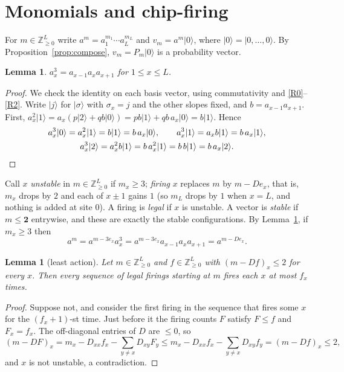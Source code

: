 \documentclass[11pt]{amsart}
\newtheorem{lemma}[theorem]{Lemma}
\theoremstyle{definition}
\theoremstyle{remark}
\newcommand{\Z}{\mathbb{Z}}
\newcommand{\ket}[1]{|#1\rangle}
\newcommand{\two}{\mathbf{2}}
\begin{document}
\section{Monomials and chip-firing}\label{sec:chip}

For $m\in\Z_{\ge0}^L$ write $a^m=a_1^{m_1}\cdots a_L^{m_L}$ and $v_m=a^m\ket{0}$, where $\ket{0}=\ket{0,\dots,0}$. By Proposition~\ref{prop:compose}, $v_m=P_m\ket0$ is a probability vector.

\begin{lemma}\label{lem:cube}
$a_x^3=a_{x-1}a_xa_{x+1}$ for $1\le x\le L$.
\end{lemma}

\begin{proof}
We check the identity on each basis vector, using commutativity and \eqref{R0}--\eqref{R2}. Write $\ket{j}$ for $\ket{\sigma}$ with $\sigma_x=j$ and the other slopes fixed, and $b=a_{x-1}a_{x+1}$. First, $a_x^2\ket1=a_x(p\ket2+qb\ket0)=pb\ket1+qb\,a_x\ket0=b\ket1$. Hence
\begin{gather*}
a_x^3\ket0=a_x^2\ket1=b\ket1=b\,a_x\ket0,\qquad
a_x^3\ket1=a_xb\ket1=b\,a_x\ket1,\\
a_x^3\ket2=a_x^2b\ket1=b\,a_x^2\ket1=b\,b\ket1=b\,a_x\ket2 .\qedhere
\end{gather*}
\end{proof}

Call $x$ \emph{unstable} in $m\in\Z_{\ge0}^L$ if $m_x\ge3$; \emph{firing} $x$ replaces $m$ by $m-De_x$, that is, $m_x$ drops by $2$ and each of $x\pm1$ gains $1$ (so $m_L$ drops by $1$ when $x=L$, and nothing is added at site $0$). A firing is \emph{legal} if $x$ is unstable. A vector is \emph{stable} if $m\le\two$ entrywise, and these are exactly the stable configurations. By Lemma~\ref{lem:cube}, if $m_x\ge3$ then
\begin{equation}\label{eq:firing}
a^m=a^{m-3e_x}a_x^3=a^{m-3e_x}a_{x-1}a_xa_{x+1}=a^{m-De_x}.
\end{equation}

\begin{lemma}[least action]\label{lem:LAP}
Let $m\in\Z_{\ge0}^L$ and $f\in\Z_{\ge0}^L$ with $(m-Df)_x\le2$ for every $x$. Then every sequence of legal firings starting at $m$ fires each $x$ at most $f_x$ times.
\end{lemma}

\begin{proof}
Suppose not, and consider the first firing in the sequence that fires some $x$ for the $(f_x+1)$-st time. Just before it the firing counts $F$ satisfy $F\le f$ and $F_x=f_x$. The off-diagonal entries of $D$ are $\le0$, so
\[
(m-DF)_x=m_x-D_{xx}f_x-\sum_{y\ne x}D_{xy}F_y\le m_x-D_{xx}f_x-\sum_{y\ne x}D_{xy}f_y=(m-Df)_x\le2,
\]
and $x$ is not unstable, a contradiction.
\end{proof}
\end{document}
